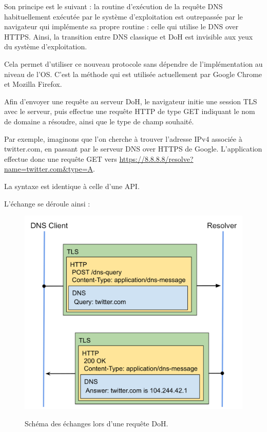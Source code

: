 \documentclass[a4paper,12pt]{article}
\begin{document}
	Son principe est le suivant : la routine d'exécution de la requête DNS habituellement exécutée par le système d'exploitation est outrepassée par le navigateur qui implémente sa propre routine : celle qui utilise le DNS over HTTPS. Ainsi, la transition entre DNS classique et DoH est invisible aux yeux du système d'exploitation. 
	
	Cela permet d'utiliser ce nouveau protocole sans dépendre de l'implémentation au niveau de l'OS. C'est la méthode qui est utilisée actuellement par Google Chrome et Mozilla Firefox.
	
	Afin d'envoyer une requête au serveur DoH, le navigateur initie une session TLS avec le serveur, puis  effectue une requête HTTP de type GET indiquant le nom de domaine a résoudre, ainsi que le type de champ souhaité.
	
	Par exemple, imaginons que l'on cherche à trouver l'adresse IPv4 associée à twitter.com, en passant par le serveur DNS over HTTPS de Google.
	L'application effectue donc une requête GET vers \url{https://8.8.8.8/resolve?name=twitter.com&type=A}.
	
	La syntaxe est identique à celle d'une API.
	
	L'échange se déroule ainsi :
	\begin{figure}[H]
		\begin{center}
			{\includegraphics[scale=0.2]{Images/tls-example.png}}
		\end{center}
		\caption{Schéma des échanges lors d'une requête DoH.}
	\end{figure}
	
\end{document}
